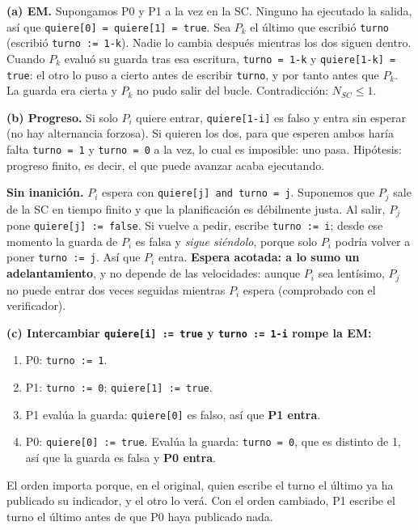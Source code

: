 \begin{solucion}
\textbf{(a) EM.} Supongamos P0 y P1 a la vez en la SC. Ninguno ha ejecutado la salida, así que
\texttt{quiere[0] = quiere[1] = true}. Sea $P_k$ el último que escribió \texttt{turno} (escribió
\texttt{turno := 1-k}). Nadie lo cambia después mientras los dos siguen dentro. Cuando $P_k$ evaluó su guarda tras
esa escritura, \texttt{turno = 1-k} y \texttt{quiere[1-k] = true}: el otro lo puso a cierto antes de escribir
\texttt{turno}, y por tanto antes que $P_k$. La guarda era cierta y $P_k$ no pudo salir del bucle.
Contradicción: $N_{SC} \le 1$.

\textbf{(b) Progreso.} Si solo $P_i$ quiere entrar, \texttt{quiere[1-i]} es falso y entra sin esperar (no hay
alternancia forzosa). Si quieren los dos, para que esperen ambos haría falta \texttt{turno = 1} y
\texttt{turno = 0} a la vez, lo cual es imposible: uno pasa. Hipótesis: progreso finito, es decir, el que puede
avanzar acaba ejecutando.

\textbf{Sin inanición.} $P_i$ espera con \texttt{quiere[j] and turno = j}. Suponemos que $P_j$ sale de la SC en
tiempo finito y que la planificación es débilmente justa. Al salir, $P_j$ pone \texttt{quiere[j] := false}. Si
vuelve a pedir, escribe \texttt{turno := i}; desde ese momento la guarda de $P_i$ es falsa y \emph{sigue siéndolo},
porque solo $P_i$ podría volver a poner \texttt{turno := j}. Así que $P_i$ entra. \textbf{Espera acotada: a lo sumo
un adelantamiento}, y no depende de las velocidades: aunque $P_i$ sea lentísimo, $P_j$ no puede entrar dos veces
seguidas mientras $P_i$ espera (comprobado con el verificador).

\textbf{(c) Intercambiar \texttt{quiere[i] := true} y \texttt{turno := 1-i} rompe la EM:}
\begin{enumerate}[leftmargin=*,noitemsep]
  \item P0: \texttt{turno := 1}.
  \item P1: \texttt{turno := 0}; \texttt{quiere[1] := true}.
  \item P1 evalúa la guarda: \texttt{quiere[0]} es falso, así que \textbf{P1 entra}.
  \item P0: \texttt{quiere[0] := true}. Evalúa la guarda: \texttt{turno = 0}, que es distinto de 1, así que la
        guarda es falsa y \textbf{P0 entra}.
\end{enumerate}
El orden importa porque, en el original, quien escribe el turno el último ya ha publicado su indicador, y el otro
lo verá. Con el orden cambiado, P1 escribe el turno el último antes de que P0 haya publicado nada.


\end{solucion}
